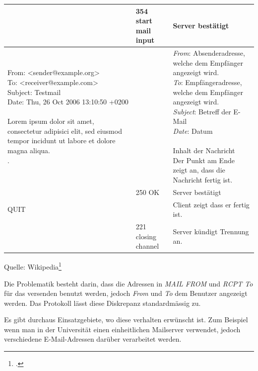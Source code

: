 \begin{center}
\begin{tabular}{ | p{5cm} | p{2cm} | p{6cm} |}
		& 354 start mail input & Server bestätigt\\ \hline
		
		\parbox[t]{5cm}{From: <sender@example.org>\\
		To: <receiver@example.com>\\
		Subject: Testmail\\
		Date: Thu, 26 Oct 2006 13:10:50 +0200\\
		\\
		Lorem ipsum dolor sit amet, consectetur adipisici elit, sed eiusmod tempor incidunt ut labore et dolore magna aliqua.\\
		.} &  
		& 
		\parbox[t]{6cm}{
		\textit{From}: Absenderadresse, welche dem Empfänger angezeigt wird.\\
		\textit{To}: Empfängeradresse, welche dem Empfänger angezeigt wird.\\
		\textit{Subject}: Betreff der E-Mail\\
		\textit{Date}: Datum\\
		\\
		Inhalt der Nachricht\\
		Der Punkt am Ende zeigt an, dass die Nachricht fertig ist.
		}\\ \hline
				
		& 250 OK & Server bestätigt\\ \hline
		
		QUIT &  & Client zeigt dass er fertig ist.\\ \hline

		& 221 closing channel & Server kündigt Trennung an.\\ \hline
    \end{tabular}
\end{center}
Quelle: Wikipedia\footcite{Simple_Mail_Transfer_Protocol__Wikipedia_2015-05-18}

Die Problematik besteht darin, dass die Adressen in \textit{MAIL FROM} und \textit{RCPT To} für das versenden benutzt werden, jedoch \textit{From} und \textit{To} dem Benutzer angezeigt werden. Das Protokoll lässt diese Diskrepanz standardmässig zu.

Es gibt durchaus Einsatzgebiete, wo diese verhalten erwünscht ist. Zum Beispiel wenn man in der Universität einen einheitlichen Mailserver verwendet, jedoch verschiedene E-Mail-Adressen darüber verarbeitet werden.

